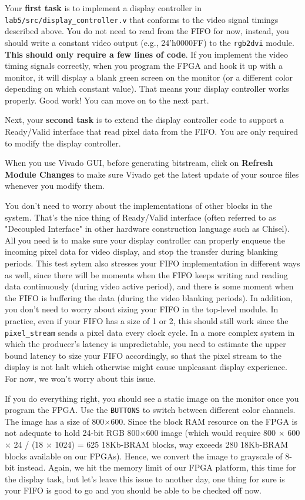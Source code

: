 \documentclass[11pt]{article}
\begin{document}
Your \textbf{first task} is to implement a display controller in \verb|lab5/src/display_controller.v| that conforms to the video signal timings described above. You do not need to read from the FIFO for now, instead, you should write a constant video output (e.g., 24'h0000FF) to the \verb|rgb2dvi| module. \textbf{This should only require a few lines of code}. If you implement the video timing signals correctly, when you program the FPGA and hook it up with a monitor, it will display a blank green screen on the monitor (or a different color depending on which constant value). That means your display controller works properly. Good work! You can move on to the next part.

Next, your \textbf{second task} is to extend the display controller code to support a Ready/Valid interface that read pixel data from the FIFO. You are only required to modify the display controller.

When you use Vivado GUI, before generating bitstream, click on \textbf{Refresh Module Changes} to make sure Vivado get the latest update of your source files whenever you modify them.

You don't need to worry about the implementations of other blocks in the system. That's the nice thing of Ready/Valid interface (often referred to as "Decoupled Interface" in other hardware construction language such as Chisel). All you need is to make sure your display controller can properly enqueue the incoming pixel data for video display, and stop the transfer during blanking periods. This test sytem also stresses your FIFO implementation in different ways as well, since there will be moments when the FIFO keeps writing and reading data continuously (during video active period), and there is some moment when the FIFO is buffering the data (during the video blanking periods). In addition, you don't need to worry about sizing your FIFO in the top-level module. In practice, even if your FIFO has a size of 1 or 2, this should still work since the \verb|pixel_stream| sends a pixel data every clock cycle. In a more complex system in which the producer's latency is unpredictable, you need to estimate the upper bound latency to size your FIFO accordingly, so that the pixel stream to the display is not halt which otherwise might cause unpleasant display experience. For now, we won't worry about this issue.

If you do everything right, you should see a static image on the monitor once you program the FPGA. Use the \verb|BUTTONS| to switch between different color channels. The image has a size of 800$\times$600. Since the block RAM resource on the FPGA is not adequate to hold 24-bit RGB 800$\times$600 image (which would require 800 $\times$ 600 $\times$ 24 / (18 $\times$ 1024) = 625 18Kb-BRAM blocks, way exceeds 280 18Kb-BRAM blocks available on our FPGAs). Hence, we convert the image to grayscale of 8-bit instead. Again, we hit the memory limit of our FPGA platform, this time for the display task, but let's leave this issue to another day, one thing for sure is your FIFO is good to go and you should be able to be checked off now.
\end{document}
